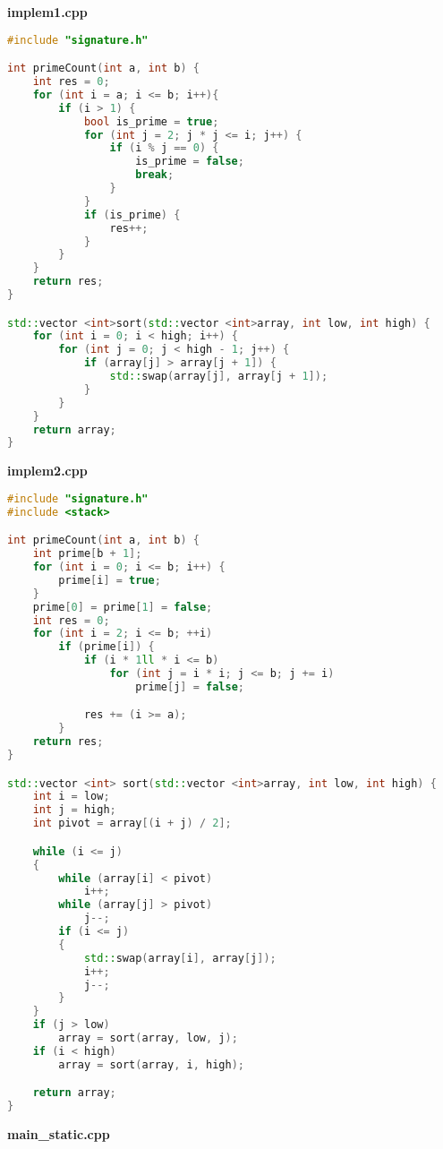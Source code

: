 \documentclass[pdf, unicode, 12pt, a4paper,oneside,fleqn]{article}
\begin{document}
{\large\textbf{implem1.cpp}}

\begin{lstlisting}[language=C++]
#include "signature.h"

int primeCount(int a, int b) {
    int res = 0;
    for (int i = a; i <= b; i++){
        if (i > 1) {
            bool is_prime = true;
            for (int j = 2; j * j <= i; j++) {
                if (i % j == 0) {
                    is_prime = false;
                    break;
                }
            }
            if (is_prime) {
                res++;
            }
        }
    }
    return res;
}

std::vector <int>sort(std::vector <int>array, int low, int high) {
    for (int i = 0; i < high; i++) {
        for (int j = 0; j < high - 1; j++) {
            if (array[j] > array[j + 1]) {
                std::swap(array[j], array[j + 1]);
            }
        }
    }
    return array;
}

\end{lstlisting}

{\large\textbf{implem2.cpp}}

\begin{lstlisting}[language=C++]
#include "signature.h"
#include <stack>

int primeCount(int a, int b) {
    int prime[b + 1];
    for (int i = 0; i <= b; i++) {
        prime[i] = true;
    }
    prime[0] = prime[1] = false;
    int res = 0;
    for (int i = 2; i <= b; ++i)
        if (prime[i]) {
            if (i * 1ll * i <= b)
                for (int j = i * i; j <= b; j += i)
                    prime[j] = false;

            res += (i >= a);
        }
    return res;
}

std::vector <int> sort(std::vector <int>array, int low, int high) {
    int i = low;
    int j = high;
    int pivot = array[(i + j) / 2];

    while (i <= j)
    {
        while (array[i] < pivot)
            i++;
        while (array[j] > pivot)
            j--;
        if (i <= j)
        {
            std::swap(array[i], array[j]);
            i++;
            j--;
        }
    }
    if (j > low)
        array = sort(array, low, j);
    if (i < high)
        array = sort(array, i, high);

    return array;
}

\end{lstlisting}

{\large\textbf{main_static.cpp}}
\end{document}
